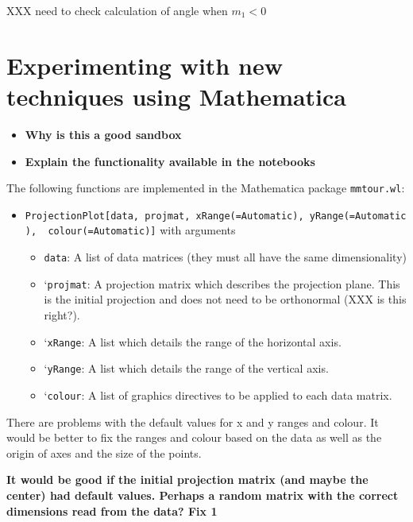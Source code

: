 \documentclass[]{interact}
\theoremstyle{plain}%
\theoremstyle{definition}
\theoremstyle{remark}
\providecommand{\tightlist}{%
  \setlength{\itemsep}{0pt}\setlength{\parskip}{0pt}}
\def\tightlist{}
\begin{document}
XXX need to check calculation of angle when \(m_1 < 0\)

\hypertarget{sec:implementation}{%
\section{Experimenting with new techniques using
Mathematica}\label{sec:implementation}}

\begin{itemize}
\tightlist
\item
  \textbf{Why is this a good sandbox}
\item
  \textbf{Explain the functionality available in the notebooks}
\end{itemize}

The following functions are implemented in the Mathematica package
\texttt{mmtour.wl}:

\begin{itemize}
\item
  \texttt{ProjectionPlot{[}data,\ projmat,\ xRange(=Automatic),\ yRange(=Automatic),\ \ colour(=Automatic){]}}
  with arguments

  \begin{itemize}
  \tightlist
  \item
    \texttt{data}: A list of data matrices (they must all have the same
    dimensionality)
  \item
    `\texttt{projmat}: A projection matrix which describes the
    projection plane. This is the initial projection and does not need
    to be orthonormal (XXX is this right?).
  \item
    `\texttt{xRange}: A list which details the range of the horizontal
    axis.
  \item
    `\texttt{yRange}: A list which details the range of the vertical
    axis.
  \item
    `\texttt{colour}: A list of graphics directives to be applied to
    each data matrix.
  \end{itemize}
\end{itemize}

There are problems with the default values for x and y ranges and
colour. It would be better to fix the ranges and colour based on the
data as well as the origin of axes and the size of the points.

\textbf{It would be good if the initial projection matrix (and maybe the
center) had default values. Perhaps a random matrix with the correct
dimensions read from the data? Fix 1}
\end{document}
